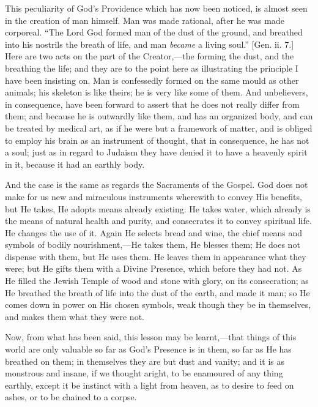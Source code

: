 This peculiarity of God's Providence which has now been noticed, is
almost seen in the creation of man himself. Man was made rational,
after he was made corporeal. ``The Lord God formed man of the dust
of the ground, and breathed into his nostrils the breath of life, and
man \emph{became} a living soul.'' [Gen. ii. 7.] Here are two acts
on the part of the Creator,—the forming the dust, and the breathing
the life; and they are to the point here as illustrating the principle
I have been insisting on. Man is confessedly formed on the same mould
as other animals; his skeleton is like theirs; he is very like some of
them. And unbelievers, in consequence, have been forward to assert
that he does not really differ from them; and because he is outwardly
like them, and has an organized body, and can be treated by medical
art, as if he were but a framework of matter, and is obliged to employ
his brain as an instrument of thought, that in consequence, he has not
a soul; just as in regard to Judaism they have denied it to have a
heavenly spirit in it, because it had an earthly body.

And the case is the same as regards the Sacraments of the Gospel.
God does not make for us new and miraculous instruments wherewith to
convey His benefits, but He takes, He adopts means already existing.
He takes water, which already is the means of natural health and
purity, and consecrates it to convey spiritual life. He changes the
use of it. Again He selects bread and wine, the chief means and
symbols of bodily nourishment,—He takes them, He blesses them; He
does not dispense with them, but He uses them. He leaves them in
appearance what they were; but He gifts them with a Divine Presence,
which before they had not. As He filled the Jewish Temple of wood and
stone with glory, on its consecration; as He breathed the breath of
life into the dust of the earth, and made it man; so He comes down in
power on His chosen symbols, weak though they be in themselves, and
makes them what they were not.

Now, from what has been said, this lesson may be learnt,—that
things of this world are only valuable so far as God's Presence is in
them, so far as He has breathed on them; in themselves they are but
dust and vanity; and it is as monstrous and insane, if we thought
aright, to be enamoured of any thing earthly, except it be instinct
with a light from heaven, as to desire to feed on ashes, or to be
chained to a corpse.

